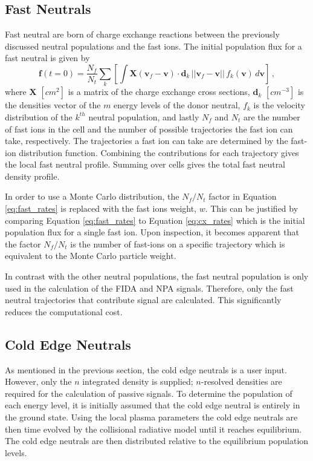 \subsection{Fast Neutrals}
Fast neutral are born of charge exchange reactions between the previously discussed neutral populations and the fast ions. 
The initial population flux for a fast neutral is given by
\begin{equation}\label{eq:fast_rates}
    \mathbf{f}(t=0) = \frac{N_f}{N_{t}}\sum_k \left [ \int \mathbf{X}(\mathbf{v}_f - \mathbf{v}) \cdot \mathbf{d}_k\, ||\mathbf{v}_f - \mathbf{v}||\, f_k(\mathbf{v})\, d\mathbf{v} \right ]\,,
\end{equation}
where $\mathbf{X}$ $[cm^2]$ is a matrix of the charge exchange cross sections, $\mathbf{d}_k$ $[cm^{-3}]$ is the densities vector of the $m$ energy levels of the donor neutral, $f_k$ is the velocity distribution of the $k^{th}$ neutral population, and lastly $N_f$ and $N_t$ are the number of fast ions in the cell and the number of possible trajectories the fast ion can take, respectively. The trajectories a fast ion can take are determined by the fast-ion distribution function. Combining the contributions for each trajectory gives the local fast neutral profile. Summing over cells gives the total fast neutral density profile.

In order to use a Monte Carlo distribution, the $N_f/N_t$ factor in Equation \ref{eq:fast_rates} is replaced with the fast ions weight, $w$. This can be justified by comparing Equation \ref{eq:fast_rates} to Equation \ref{eq:cx_rates} which is the initial population flux for a single fast ion. Upon inspection, it becomes apparent that the factor $N_f/N_t$ is the number of fast-ions on a specific trajectory which is equivalent to the Monte Carlo particle weight.

In contrast with the other neutral populations, the fast neutral population is only used in the calculation of the FIDA and NPA signals. Therefore, only the fast neutral trajectories that contribute signal are calculated. This significantly reduces the computational cost.

\subsection{Cold Edge Neutrals}
As mentioned in the previous section, the cold edge neutrals is a user input. However, only the $n$ integrated density is supplied; $n$-resolved densities are required for the calculation of passive signals. To determine the population of each energy level, it is initially assumed that the cold edge neutral is entirely in the ground state. Using the local plasma parameters the cold edge neutrals are then time evolved by the collisional radiative model until it reaches equilibrium. The cold edge neutrals are then distributed relative to the equilibrium population levels.

